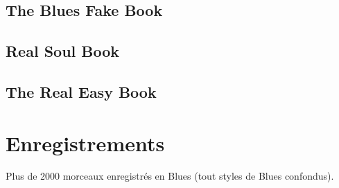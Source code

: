\documentclass[a4paper]{book}
\begin{document}
\section{The Blues Fake Book}
\section{Real Soul Book}
\section{The Real Easy Book}


\clearpage\chapter{Enregistrements}
Plus de 2000 morceaux enregistr\'es en Blues (tout styles de Blues confondus).
\end{document}
